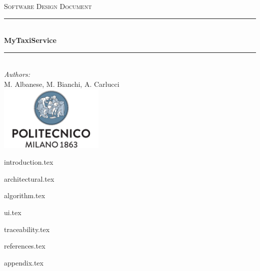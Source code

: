 \documentclass[a4paper,11pt]{article}
\begin{document}
\begin{titlepage}
\begin{center}
\textsc{\LARGE Software Design Document}\\[1.5cm] %
 
\rule{\linewidth}{0.5mm} \\[0.7cm]
{\huge \bfseries MyTaxiService}\\[0.4cm] %
\rule{\linewidth}{0.5mm} \\[1.5cm]
 
\emph{Authors:}\\
M. Albanese, M. Bianchi, A. Carlucci\\[2.0cm] 

\vfill
\vfill
\includegraphics[width=50mm]{polimi.png}\\
\end{center}
\end{titlepage}

\tableofcontents
\pagebreak

{introduction.tex}

{architectural.tex}

{algorithm.tex}

{ui.tex}

{traceability.tex}

{references.tex}

{appendix.tex}
\end{document}
